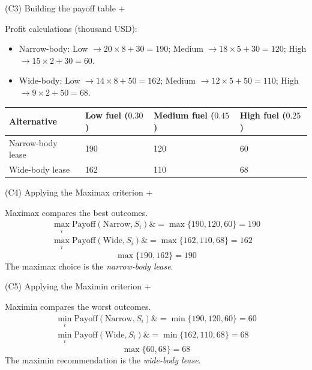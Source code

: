 \documentclass[11pt]{article}
\begin{document}
	
	
	
	
	
	(C3) Building the payoff table
	+
	
	
	Profit calculations (thousand USD):
	\begin{itemize}
		\item Narrow-body: Low $\to 20 \times 8 + 30 = 190$; Medium $\to 18 \times 5 + 30 = 120$; High $\to 15 \times 2 + 30 = 60$.
		\item Wide-body: Low $\to 14 \times 8 + 50 = 162$; Medium $\to 12 \times 5 + 50 = 110$; High $\to 9 \times 2 + 50 = 68$.
	\end{itemize}
	
	\begin{center}
		\begin{tabular}{llll}
			\toprule
			Alternative & Low fuel
			($0.30$) & Medium fuel
			($0.45$) & High fuel
			($0.25$) \\
			\midrule
			Narrow-body lease & 190 & 120 & 60 \\
			Wide-body lease & 162 & 110 & 68 \\
			\bottomrule
		\end{tabular}
	\end{center}
	
	
	
	
	
	
	(C4) Applying the Maximax criterion
	+
	
	
	Maximax compares the best outcomes.
	\[
	\begin{aligned}
		\max_i \text{Payoff}(\text{Narrow}, S_i) \&= \max\{190, 120, 60\} = 190 \\
		\max_i \text{Payoff}(\text{Wide}, S_i) \&= \max\{162, 110, 68\} = 162
	\end{aligned}
	\]
	\[
	\max\{190, 162\} = 190
	\]
	The maximax choice is the \emph{narrow-body lease}.
	
	
	
	
	
	(C5) Applying the Maximin criterion
	+
	
	
	Maximin compares the worst outcomes.
	\[
	\begin{aligned}
		\min_i \text{Payoff}(\text{Narrow}, S_i) \&= \min\{190, 120, 60\} = 60 \\
		\min_i \text{Payoff}(\text{Wide}, S_i) \&= \min\{162, 110, 68\} = 68
	\end{aligned}
	\]
	\[
	\max\{60, 68\} = 68
	\]
	The maximin recommendation is the \emph{wide-body lease}.
	
	
	
\end{document}
